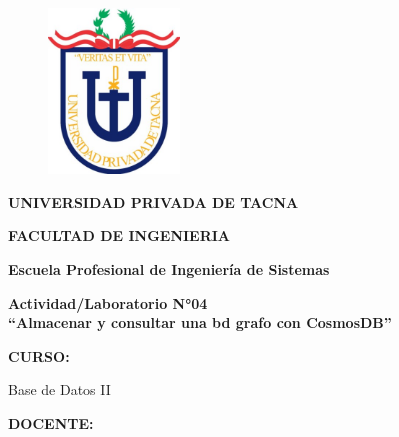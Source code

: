 \documentclass[12pt,letterpaper]{article}
\begin{document}
	\begin{titlepage}
		\begin{center}
			\begin{figure}[htb]
				\begin{center}
					\includegraphics[width=3.5cm]{./img/upt}
				\end{center}
			\end{figure}
			\vspace*{0.15in}
			\begin{Large}
				\textbf{UNIVERSIDAD PRIVADA DE TACNA}\\
			\end{Large}
			\vspace*{0.15in}
			\begin{Large}
				\textbf{FACULTAD DE INGENIERIA} \\
			\end{Large}
			\vspace*{0.1in}
			\begin{Large}
				\textbf{Escuela Profesional de Ingeniería de Sistemas} \\
			\end{Large}
			\vspace*{0.3in}
			\begin{Large}
				\textbf{Actividad/Laboratorio N°04}\\
				\textbf{“Almacenar y consultar una bd grafo con CosmosDB”}\\
			\end{Large}
			\vspace*{0.2in}
			\begin{Large}
				\textbf{CURSO:} \\
			\end{Large}
			\vspace*{0.1in}
			\begin{large}
				Base de Datos II\\
			\end{large}
			\vspace*{0.2in}
			\begin{Large}
				\textbf{DOCENTE:} \\

\end{Large}
\end{center}
\end{titlepage}
\end{document}
